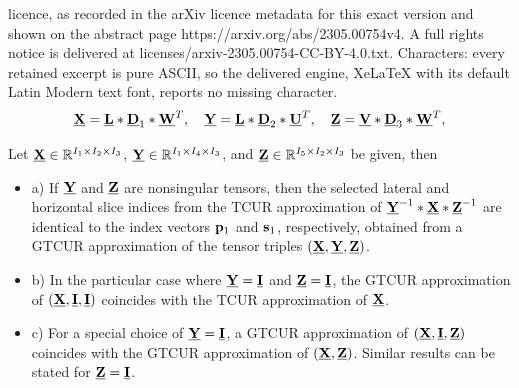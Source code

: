 \documentclass[10pt,a4paper]{amsart}
\newcommand{\I}{{\bf I}}
\newcommand{\cD}{\underline{\bf D}}
\newcommand{\cL}{\underline{\bf L}}
\newcommand{\cU}{\underline{\bf U}}
\newcommand{\cV}{\underline{\bf V}}
\newcommand{\cW}{\underline{\bf W}}
\newcommand{\cX}{\underline{\bf X}}
\newcommand{\cY}{\underline{\bf Y}}
\newcommand{\cZ}{\underline{\bf Z}}
\begin{document}
licence, as recorded in the arXiv licence metadata for this exact version and shown on the abstract page https://arxiv.org/abs/2305.00754v4. A full rights notice is delivered at licenses/arxiv-2305.00754-CC-BY-4.0.txt. Characters: every retained excerpt is pure ASCII, so the delivered engine, XeLaTeX with its default Latin Modern text font, reports no missing character.
\begin{equation}\label{rsvd}
\cX=\cL*\cD_1*\cW^T,\quad \cY=\cL*\cD_2*\cU^T,\quad \cZ=\cV*\cD_3*\cW^T,
\end{equation}

\begin{thm} Let $\cX\in\mathbb{R}^{I_1\times I_2\times I_3}$, $\cY\in\mathbb{R}^{I_1\times I_4\times I_3}$, and $\cZ\in\mathbb{R}^{I_5\times I_2\times I_3}$ be given, then

\begin{itemize}
\item a) If $\cY$ and $\cZ$ are nonsingular tensors, then the selected lateral and horizontal slice indices from the TCUR approximation of $\cY^{-1}*\cX*\cZ^{-1}$ are identical to the index vectors ${\bf p}_1$ and ${\bf s}_1$, respectively,  obtained from a GTCUR approximation of the tensor triples $(\cX,\cY,\cZ)$.

\item  b) In the particular case where $\cY = \underline{\I}$ and $\cZ = \underline{\I}$, the GTCUR approximation of $(\cX,\underline{\bf I},\underline{\bf I})$ coincides with the TCUR approximation of $\cX$.

\item c) For a special choice of $\cY=\underline{\bf I}$, a GTCUR approximation of $(\cX,\underline{\bf I},\cZ)$ coincides with the GTCUR approximation of $(\cX,\cZ)$. Similar results can be stated for $\cZ = \underline{\bf I}$.
\end{itemize}
\end{thm}
\end{document}
